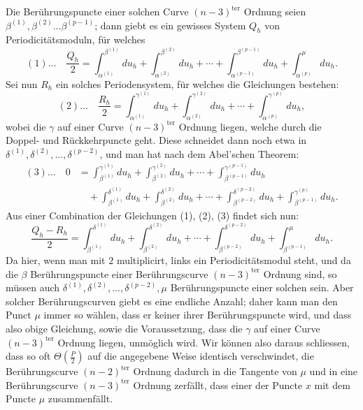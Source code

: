\documentclass[10pt]{article}
\begin{document}
Die Berührungspuncte einer solchen Curve \((n-3)^{\text{ter}}\) Ordnung seien \(\beta^{(1)},\beta^{(2)}\ldots\beta^{(p-1)}\); dann giebt es ein gewisses System \(Q_h\) von Periodicitätsmoduln, für welches
\[
(1)\ldots\quad
\frac{Q_h}{2}
=\int_{\alpha^{(1)}}^{\beta^{(1)}}du_h
+\int_{\alpha^{(2)}}^{\beta^{(2)}}du_h
+\cdots+
\int_{\alpha^{(p-1)}}^{\beta^{(p-1)}}du_h
+\int_{\alpha^{(p)}}^{\mu}du_h.
\]
Sei nun \(R_h\) ein solches Periodensystem, für welches die Gleichungen bestehen:
\[
(2)\ldots\quad
\frac{R_h}{2}
=\int_{\alpha^{(1)}}^{\gamma^{(1)}}du_h
+\int_{\alpha^{(2)}}^{\gamma^{(2)}}du_h
+\cdots+
\int_{\alpha^{(p)}}^{\gamma^{(p)}}du_h,
\]
wobei die \(\gamma\) auf einer Curve \((n-3)^{\text{ter}}\) Ordnung liegen, welche durch die Doppel- und Rückkehrpuncte geht. Diese schneidet dann noch etwa in \(\delta^{(1)},\delta^{(2)},\ldots,\delta^{(p-2)}\), und man hat nach dem Abel'schen Theorem:
\[
\begin{aligned}
(3)\ldots\quad 0
&=\int_{\beta^{(1)}}^{\gamma^{(1)}}du_h
+\int_{\beta^{(2)}}^{\gamma^{(2)}}du_h
+\cdots+
\int_{\beta^{(p-1)}}^{\gamma^{(p-1)}}du_h\\
&\quad{}+\int_{\beta^{(1)}}^{\delta^{(1)}}du_h
+\int_{\beta^{(2)}}^{\delta^{(2)}}du_h
+\cdots+
\int_{\beta^{(p-2)}}^{\delta^{(p-2)}}du_h
+\int_{\beta^{(p-1)}}^{\gamma^{(p)}}du_h.
\end{aligned}
\]
Aus einer Combination der Gleichungen (1), (2), (3) findet sich nun:
\[
\frac{Q_h-R_h}{2}
=\int_{\beta^{(1)}}^{\delta^{(1)}}du_h
+\int_{\beta^{(2)}}^{\delta^{(2)}}du_h
+\cdots+
\int_{\beta^{(p-2)}}^{\delta^{(p-2)}}du_h
+\int_{\beta^{(p-1)}}^{\mu}du_h.
\]
Da hier, wenn man mit \(2\) multiplicirt, links ein Periodicitätsmodul steht, und da die \(\beta\) Berührungspuncte einer Berührungscurve \((n-3)^{\text{ter}}\) Ordnung sind, so müssen auch \(\delta^{(1)},\delta^{(2)},\ldots,\delta^{(p-2)},\mu\) Berührungspuncte einer solchen sein. Aber solcher Berührungscurven giebt es eine endliche Anzahl; daher kann man den Punct \(\mu\) immer so wählen, dass er keiner ihrer Berührungspuncte wird, und dass also obige Gleichung, sowie die Voraussetzung, dass die \(\gamma\) auf einer Curve \((n-3)^{\text{ter}}\) Ordnung liegen, unmöglich wird. Wir können also daraus schliessen, dass so oft \(\Theta\left(\frac P2\right)\) auf die angegebene Weise identisch verschwindet, die Berührungscurve \((n-2)^{\text{ter}}\) Ordnung dadurch in die Tangente von \(\mu\) und in eine Berührungscurve \((n-3)^{\text{ter}}\) Ordnung zerfällt, dass einer der Puncte \(x\) mit dem Puncte \(\mu\) zusammenfällt.
\end{document}
